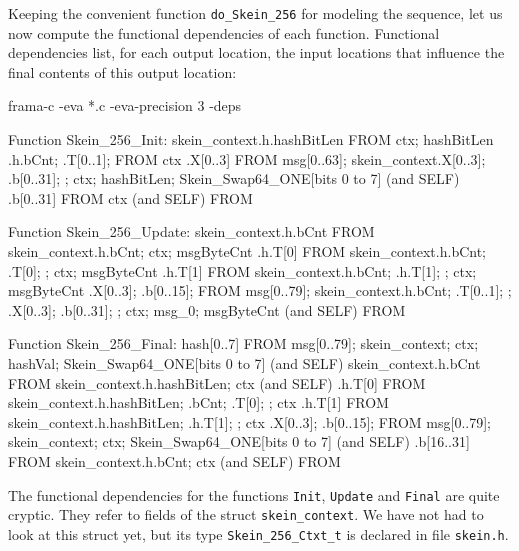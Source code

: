\documentclass{frama-c-book}
\begin{document}
Keeping the convenient function \lstinline|do_Skein_256| for modeling the
sequence, let us now compute the functional dependencies of each function.
Functional dependencies list, for each output location,
the input locations that influence the final contents of this output location:
\begin{frama-c-commands}
frama-c -eva *.c -eva-precision 3 -deps
\end{frama-c-commands}
\begin{logsmath}
Function Skein_256_Init:
  skein_context.h.hashBitLen FROM ctx; hashBitLen
               .h{.bCnt; .T[0..1]; } FROM ctx
               .X[0..3] FROM msg[0..63];
                             skein_context{.X[0..3]; .b[0..31]; }; ctx;
                             hashBitLen; Skein_Swap64_ONE[bits 0 to 7] (and SELF)
               .b[0..31] FROM ctx (and SELF)
  \result FROM \nothing

Function Skein_256_Update:
  skein_context.h.bCnt FROM skein_context.h.bCnt; ctx; msgByteCnt
               .h.T[0] FROM skein_context.h{.bCnt; .T[0]; }; ctx; msgByteCnt
               .h.T[1] FROM skein_context{.h.bCnt; .h.T[1]; }; ctx;
                            msgByteCnt
               {.X[0..3]; .b[0..15]; } FROM msg[0..79];
                                            skein_context{.h{.bCnt; .T[0..1]; };
                                                          .X[0..3]; .b[0..31]; };
                                             ctx; msg_0; msgByteCnt (and SELF)
  \result FROM \nothing

Function Skein_256_Final:
  hash[0..7] FROM msg[0..79]; skein_context; ctx;
                  hashVal; Skein_Swap64_ONE[bits 0 to 7] (and SELF)
  skein_context.h.bCnt FROM skein_context.h.hashBitLen; ctx (and SELF)
               .h.T[0] FROM skein_context.h{.hashBitLen; .bCnt; .T[0]; }; ctx
               .h.T[1] FROM skein_context{.h.hashBitLen; .h.T[1]; }; ctx
               {.X[0..3]; .b[0..15]; } FROM msg[0..79]; skein_context; ctx;
                                            Skein_Swap64_ONE[bits 0 to 7]
                                            (and SELF)
               .b[16..31] FROM skein_context.h.bCnt; ctx (and SELF)
  \result FROM \nothing
\end{logsmath}
The functional dependencies for the functions \lstinline|Init|,
\lstinline|Update| and \lstinline|Final| are quite cryptic. They refer
to fields of the struct \lstinline|skein_context|. We have not had
to look at this struct yet, but its type \lstinline|Skein_256_Ctxt_t|
is declared in file \verb|skein.h|.
\end{document}

